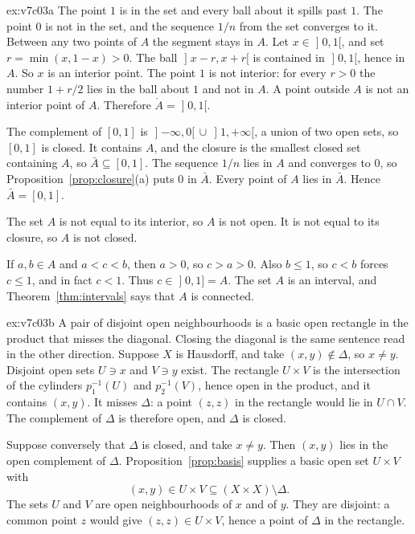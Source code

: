 \begin{solution}{ex:v7c03a}
\idea The point $1$ is in the set and every ball about it spills past $1$. The point $0$ is not in the set, and the sequence $1/n$ from the set converges to it. Between any two points of $A$ the segment stays in $A$.
\writeup Let $x\in\mathopen]0,1[$, and set $r=\min(x,1-x)>0$. The ball $\mathopen]x-r,x+r[$ is contained in $\mathopen]0,1[$, hence in $A$. So $x$ is an interior point. The point $1$ is not interior: for every $r>0$ the number $1+r/2$ lies in the ball about $1$ and not in $A$. A point outside $A$ is not an interior point of $A$. Therefore $\mathring A=\mathopen]0,1[$.

The complement of $[0,1]$ is $\mathopen]-\infty,0[\,\cup\,\mathopen]1,+\infty[$, a union of two open sets, so $[0,1]$ is closed. It contains $A$, and the closure is the smallest closed set containing $A$, so $\bar A\subseteq[0,1]$. The sequence $1/n$ lies in $A$ and converges to $0$, so Proposition~\ref{prop:closure}(a) puts $0$ in $\bar A$. Every point of $A$ lies in $\bar A$. Hence $\bar A=[0,1]$.

The set $A$ is not equal to its interior, so $A$ is not open. It is not equal to its closure, so $A$ is not closed.

If $a,b\in A$ and $a<c<b$, then $a>0$, so $c>a>0$. Also $b\le1$, so $c<b$ forces $c\le1$, and in fact $c<1$. Thus $c\in\mathopen]0,1]=A$. The set $A$ is an interval, and Theorem~\ref{thm:intervals} says that $A$ is connected.
\end{solution}

\begin{solution}{ex:v7c03b}
\idea A pair of disjoint open neighbourhoods is a basic open rectangle in the product that misses the diagonal. Closing the diagonal is the same sentence read in the other direction.
\writeup Suppose $X$ is Hausdorff, and take $(x,y)\notin\Delta$, so $x\ne y$. Disjoint open sets $U\ni x$ and $V\ni y$ exist. The rectangle $U\times V$ is the intersection of the cylinders $p_1^{-1}(U)$ and $p_2^{-1}(V)$, hence open in the product, and it contains $(x,y)$. It misses $\Delta$: a point $(z,z)$ in the rectangle would lie in $U\cap V$. The complement of $\Delta$ is therefore open, and $\Delta$ is closed.

Suppose conversely that $\Delta$ is closed, and take $x\ne y$. Then $(x,y)$ lies in the open complement of $\Delta$. Proposition~\ref{prop:basis} supplies a basic open set $U\times V$ with
\[
(x,y)\in U\times V\subseteq (X\times X)\setminus\Delta.
\]
The sets $U$ and $V$ are open neighbourhoods of $x$ and of $y$. They are disjoint: a common point $z$ would give $(z,z)\in U\times V$, hence a point of $\Delta$ in the rectangle.
\end{solution}

